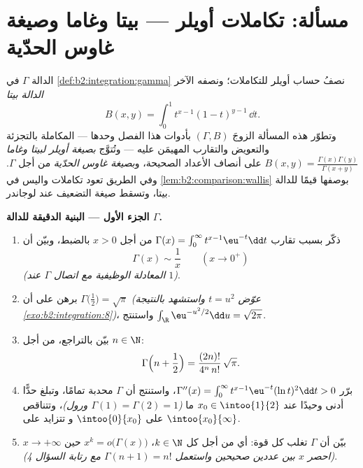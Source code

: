 \section{مسألة: تكاملات أويلر --- بيتا وغاما وصيغة غاوس
الحدّية}

\begin{problem}\label{pb:b2:integration:1}
الدالة $\Gamma$ في \cref{def:b2:integration:gamma} نصفُ
حساب أويلر للتكاملات؛ ونصفه الآخر
\emph{الدالة بيتا}
\[
B(x, y) = \int_0^1 t^{x-1}(1 - t)^{y-1}\,\dd t .
\]
وتطوّر هذه المسألة الزوجَ $(\Gamma, B)$ بأدوات
هذا الفصل وحدها --- المكاملة بالتجزئة والتعويض
والتقارب المهيمَن عليه --- وتُتوَّج \emph{بصيغة أويلر
لبيتا وغاما} $B(x,y) = \frac{\Gamma(x)\Gamma(y)}
{\Gamma(x+y)}$ على أنصاف الأعداد الصحيحة، و\emph{بصيغة غاوس
الحدّية} من أجل $\Gamma$. وفي الطريق
تعود تكاملات واليس في \cref{lem:b2:comparison:wallis}
بوصفها قيمًا للدالة بيتا، وتسقط صيغة التضعيف عند لوجاندر.

\medskip
\noindent\textbf{الجزء الأول --- البنية الدقيقة للدالة $\Gamma$.}
\begin{enumerate}
  \item ذكّر بسبب تقارب $\Gamma(x) = \int_0^\infty t^{x-1}\eu^{-t}\dd
        t$ من أجل $x > 0$ بالضبط، وبيّن أن
        \[
        \Gamma(x) \sim \frac1x \qquad (x \to 0^+)
        \]
        \emph{(المعادلة الوظيفية مع اتصال $\Gamma$ عند
        $1$)}.
  \item برهن على أن $\Gamma\bigl(\tfrac12\bigr) = \sqrt\pi$
        \emph{(عوّض $t = u^2$ واستشهد بالنتيجة
        \cref{exo:b2:integration:8})}، واستنتج
        $\int_\R \eu^{-u^2/2}\dd u = \sqrt{2\pi}$.
  \item بيّن بالتراجع، من أجل $n \in \N$:
        \[
        \Gamma\Bigl(n + \frac12\Bigr)
        = \frac{(2n)!}{4^n\,n!}\,\sqrt\pi .
        \]
  \item برّر $\Gamma''(x) = \int_0^\infty
        t^{x-1}\eu^{-t}(\ln t)^2\dd t > 0$، واستنتج أن
        $\Gamma$ محدبة تمامًا، وتبلغ حدًّا أدنى وحيدًا عند
        $x_0 \in \intoo{1}{2}$ ما \emph{($\Gamma(1) = \Gamma(2)
        = 1$ ورول)}، وتتناقص على $\intoo{0}{x_0}$ و
        تتزايد على $\intoo{x_0}{\infty}$.
  \item بيّن أن $\Gamma$ تغلب كل قوة: أي من أجل كل $k \in
        \N$، $x^k = o\bigl(\Gamma(x)\bigr)$ حين $x \to +\infty$
        \emph{(احصر $x$ بين عددين صحيحين واستعمل $\Gamma(n+1)
        = n!$ مع رتابة السؤال 4)}.
\end{enumerate}


\end{problem}

